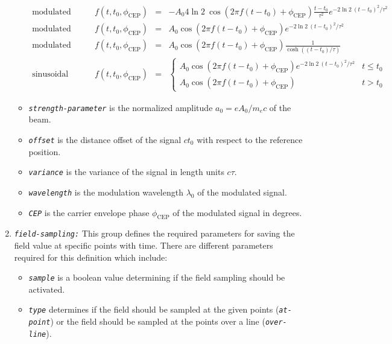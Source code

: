 \begin{enumerate}
\begin{itemize}
\begin{equation}
	\begin{array}{lrcl}
	\mbox{modulated Neumann:}  \qquad & f(t,t_0,\phi_\mathrm{CEP}) & = & \displaystyle - A_0 4 \ln 2 \: \cos( 2 \pi f (t - t_0) + \phi_\mathrm{CEP} ) \frac{t - t_0}{\tau^2} e^{-2 \ln 2 \: (t - t_0)^2/\tau^2 } \\
	\mbox{modulated Gaussian:} \qquad & f(t,t_0,\phi_\mathrm{CEP}) & = & \displaystyle A_0 \cos( 2 \pi f (t - t_0) + \phi_\mathrm{CEP} ) e^{-2 \ln 2 \: (t - t_0)^2/\tau^2 } \\
	\mbox{modulated hyperbolic secant:} \qquad & f(t,t_0,\phi_\mathrm{CEP}) & = & \displaystyle A_0 \cos( 2 \pi f (t - t_0) + \phi_\mathrm{CEP} ) \frac{1}{\cosh ( (t - t_0)/\tau ) } \\
	\mbox{sinusoidal pulse:}   \qquad & f(t,t_0,\phi_\mathrm{CEP}) & = & \displaystyle \left\{ \begin{array}{ll} A_0 \cos( 2 \pi f (t - t_0) + \phi_\mathrm{CEP} ) e^{-2 \ln 2 \: (t - t_0)^2/\tau^2 } & t \leq t_0 \\ A_0 \cos( 2 \pi f (t - t_0) + \phi_\mathrm{CEP} ) & t > t_0 \end{array} \right.
	\end{array}
	\end{equation}
	\item {\tt \small \em strength-parameter} is the normalized amplitude $a_0 = e A_0 / m_ec $ of the beam.
	\item {\tt \small \em offset} is the distance offset of the signal $ct_0$ with respect to the reference position.
	\item {\tt \small \em variance} is the variance of the signal in length units $c\tau$.
	\item {\tt \small \em wavelength} is the modulation wavelength $\lambda_0$ of the modulated signal.
	\item {\tt \small \em CEP} is the carrier envelope phase $\phi_{\mathrm{CEP}}$ of the modulated signal in degrees.
\end{itemize}
%
\item {\tt \small \em field-sampling:} This group defines the required parameters for saving the field value at specific points with time. There are different parameters required for this definition which include:
%
\begin{itemize}
	\item {\tt \small \em sample} is a boolean value determining if the field sampling should be activated.
	\item {\tt \small \em type} determines if the field should be sampled at the given points ({\tt \small \em at-point}) or the field should be sampled at the points over a line ({\tt \small \em over-line}).

\end{itemize}
\end{enumerate}
